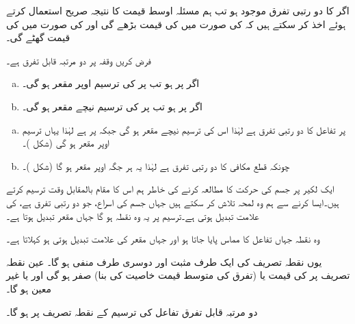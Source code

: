 اگر  کا دو رتبی تفرق موجود ہو تب ہم مسئلہ اوسط قیمت کا نتیجہ صریح  استعمال کرتے ہوئے اخذ کر سکتے ہیں کہ  کی صورت میں  کی قیمت بڑھے گی اور  کی صورت میں  کی قیمت گھٹے گی۔ 


فرض کریں وقفہ  پر  دو مرتبہ قابل تفرق ہے۔
\begin{enumerate}[a.]
\item
اگر  پر  ہو تب  پر  کی ترسیم اوپر مقعر ہو گی۔
\item
اگر  پر  ہو تب  پر  کی ترسیم نیچے مقعر ہو گی۔
\end{enumerate}

\begin{enumerate}[a.]
\item
{} پر تفاعل  کا دو رتبی تفرق  ہے  لہٰذا اس کی ترسیم نیچے مقعر ہو گی جبکہ  پر  ہے لہٰذا یہاں ترسیم اوپر مقعر ہو گی (شکل )۔
\item
چونکہ قطع مکافی  کا دو رتبی تفرق  ہے لہٰذا یہ ہر جگہ اوپر مقعر ہو گا (شکل )۔ 
\end{enumerate}
ایک لکیر پر جسم کی حرکت کا مطالعہ کرنے کی خاطر ہم اس کا مقام بالمقابل وقت ترسیم کرتے ہیں۔ایسا کرنے سے ہم وہ لمحہ تلاش کر سکتے  ہیں جہاں جسم کی اسراع، جو دو رتبی تفرق ہے، کی علامت تبدیل ہوتی ہے۔ترسیم پر یہ وہ نقطہ ہو گا جہاں مقعر تبدیل ہوتا ہے۔

وہ نقطہ جہاں تفاعل کا مماس پایا جاتا ہو اور جہاں مقعر کی علامت تبدیل ہوتی ہو  کہلاتا ہے۔

یوں نقطہ تصریف کی ایک طرف  مثبت اور دوسری طرف منفی ہو گا۔ عین نقطہ تصریف پر  کی قیمت یا (تفرق کی متوسط قیمت خاصیت کی بنا) صفر ہو گی  اور یا  غیر معین ہو گا۔

دو مرتبہ قابل تفرق تفاعل کی ترسیم کے نقطہ تصریف پر  ہو گا۔

